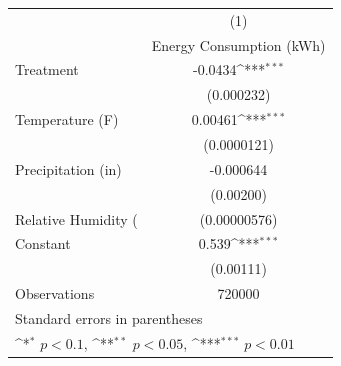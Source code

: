 {
\def\sym#1{\ifmmode^{#1}\else\(^{#1}\)\fi}
\begin{tabular}{l*{1}{c}}
\hline\hline
                    &\multicolumn{1}{c}{(1)}\\
                    &\multicolumn{1}{c}{Energy Consumption (kWh)}\\
\hline
Treatment           &     -0.0434\sym{***}\\
                    &  (0.000232)         \\
[1em]
Temperature (F)     &     0.00461\sym{***}\\
                    & (0.0000121)         \\
[1em]
Precipitation (in)  &   -0.000644         \\
                    &   (0.00200)         \\
[1em]
Relative Humidity (%
                    &(0.00000576)         \\
[1em]
Constant            &       0.539\sym{***}\\
                    &   (0.00111)         \\
\hline
Observations        &      720000         \\
\hline\hline
\multicolumn{2}{l}{\footnotesize Standard errors in parentheses}\\
\multicolumn{2}{l}{\footnotesize \sym{*} \(p<0.1\), \sym{**} \(p<0.05\), \sym{***} \(p<0.01\)}\\
\end{tabular}
}
